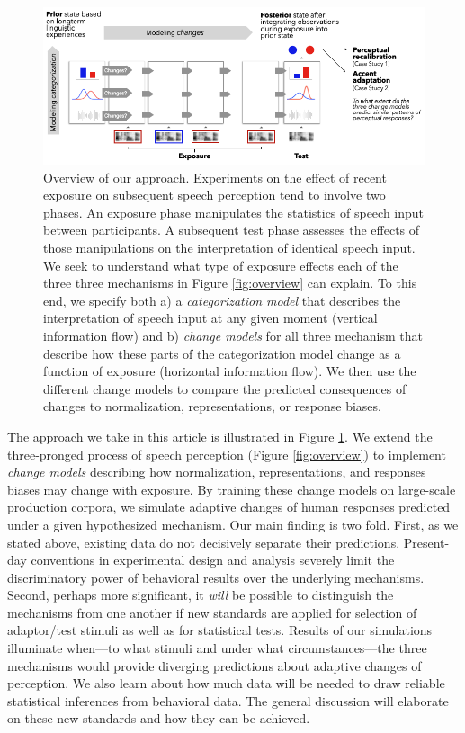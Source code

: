 \documentclass[
  11pt,
  man,floatsintext]{apa6}
\begin{document}
\begin{figure}[h]
\begin{center}
\includegraphics[width=.99\columnwidth]{../figures/diagrams/overview-of-changes.png}
\caption{Overview of our approach. Experiments on the effect of recent exposure on subsequent speech perception tend to involve two phases. An exposure phase manipulates the statistics of speech input between participants. A subsequent test phase assesses the effects of those manipulations on the interpretation of identical speech input. We seek to understand what type of exposure effects each of the three three mechanisms in Figure \ref{fig:overview} can explain. To this end, we specify both a) a {\em categorization model} that describes the interpretation of speech input at any given moment (vertical information flow) and b) {\em change models} for all three mechanism that describe how these parts of the categorization model change as a function of exposure (horizontal information flow). We then use the different change models to compare the predicted consequences of changes to normalization, representations, or response biases.}\label{fig:overview-change}
\end{center}
\end{figure}

The approach we take in this article is illustrated in Figure \ref{fig:overview-change}. We extend the three-pronged process of speech perception (Figure \ref{fig:overview}) to implement \emph{change models} describing how normalization, representations, and responses biases may change with exposure. By training these change models on large-scale production corpora, we simulate adaptive changes of human responses predicted under a given hypothesized mechanism. Our main finding is two fold. First, as we stated above, existing data do not decisively separate their predictions. Present-day conventions in experimental design and analysis severely limit the discriminatory power of behavioral results over the underlying mechanisms. Second, perhaps more significant, it \emph{will} be possible to distinguish the mechanisms from one another if new standards are applied for selection of adaptor/test stimuli as well as for statistical tests. Results of our simulations illuminate when---to what stimuli and under what circumstances---the three mechanisms would provide diverging predictions about adaptive changes of perception. We also learn about how much data will be needed to draw reliable statistical inferences from behavioral data. The general discussion will elaborate on these new standards and how they can be achieved.
\end{document}

